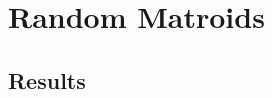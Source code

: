 \section{Random Matroids}\label{random-matroids}

\skelpars[8]{}


\subsection*{Results}
\begin{table*}[ht]
  \centering
  \skelcaption[1]{}
  \skeltabular[10]
\end{table*}
\skelpars[4]{}